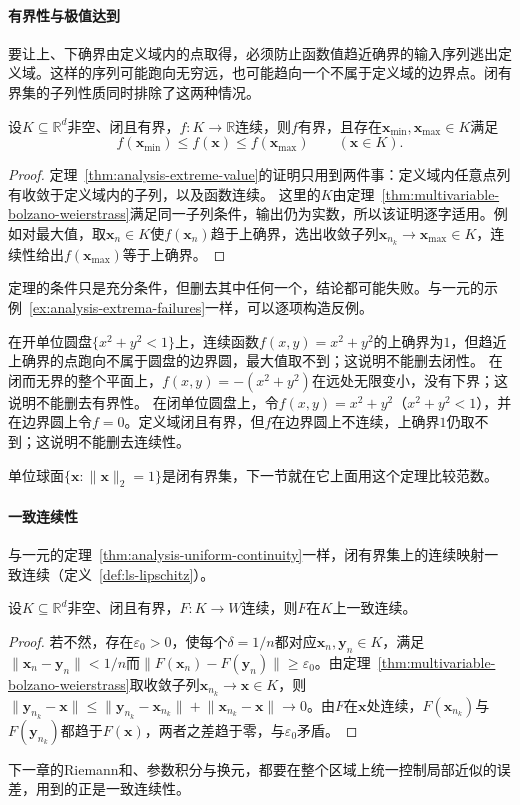\paragraph{有界性与极值达到}
要让上、下确界由定义域内的点取得，必须防止函数值趋近确界的输入序列逃出定义域。这样的序列可能跑向无穷远，也可能趋向一个不属于定义域的边界点。闭有界集的子列性质同时排除了这两种情况。
\begin{theorem}[闭有界集上的极值定理]
\label{thm:multivariable-extreme-value}
设$K\subseteq\mathbb R^d$非空、闭且有界，$f:K\to\mathbb R$连续，则$f$有界，且存在$\bm x_{\min},\bm x_{\max}\in K$满足
\[
 f(\bm x_{\min})\leq f(\bm x)\leq f(\bm x_{\max})\qquad(\bm x\in K).
\]
\end{theorem}
\begin{proof}
定理~\ref{thm:analysis-extreme-value}的证明只用到两件事：定义域内任意点列有收敛于定义域内的子列，以及函数连续。
这里的$K$由定理~\ref{thm:multivariable-bolzano-weierstrass}满足同一子列条件，输出仍为实数，所以该证明逐字适用。例如对最大值，取$\bm x_n\in K$使$f(\bm x_n)$趋于上确界，选出收敛子列$\bm x_{n_k}\to\bm x_{\max}\in K$，连续性给出$f(\bm x_{\max})$等于上确界。
\end{proof}
定理的条件只是充分条件，但删去其中任何一个，结论都可能失败。与一元的示例~\ref{ex:analysis-extrema-failures}一样，可以逐项构造反例。
\begin{example}
\label{ex:multivariable-extreme-value-failures}
在开单位圆盘$\{x^2+y^2<1\}$上，连续函数$f(x,y)=x^2+y^2$的上确界为$1$，但趋近上确界的点跑向不属于圆盘的边界圆，最大值取不到；这说明不能删去闭性。
在闭而无界的整个平面上，$f(x,y)=-(x^2+y^2)$在远处无限变小，没有下界；这说明不能删去有界性。
在闭单位圆盘上，令$f(x,y)=x^2+y^2$（$x^2+y^2<1$），并在边界圆上令$f=0$。定义域闭且有界，但$f$在边界圆上不连续，上确界$1$仍取不到；这说明不能删去连续性。
\end{example}

单位球面$\{\bm x:\lVert\bm x\rVert_2=1\}$是闭有界集，下一节就在它上面用这个定理比较范数。

\paragraph{一致连续性}
与一元的定理~\ref{thm:analysis-uniform-continuity}一样，闭有界集上的连续映射一致连续（定义~\ref{def:ls-lipschitz}）。
\begin{theorem}[闭有界集上的一致连续性]
\label{thm:multivariable-uniform-continuity}
设$K\subseteq\mathbb R^d$非空、闭且有界，$F:K\to W$连续，则$F$在$K$上一致连续。
\end{theorem}
\begin{proof}
若不然，存在$\varepsilon_0>0$，使每个$\delta=1/n$都对应$\bm x_n,\bm y_n\in K$，满足$\lVert\bm x_n-\bm y_n\rVert<1/n$而$\lVert F(\bm x_n)-F(\bm y_n)\rVert\geq\varepsilon_0$。由定理~\ref{thm:multivariable-bolzano-weierstrass}取收敛子列$\bm x_{n_k}\to\bm x\in K$，则$\lVert\bm y_{n_k}-\bm x\rVert\leq\lVert\bm y_{n_k}-\bm x_{n_k}\rVert+\lVert\bm x_{n_k}-\bm x\rVert\to0$。由$F$在$\bm x$处连续，$F(\bm x_{n_k})$与$F(\bm y_{n_k})$都趋于$F(\bm x)$，两者之差趋于零，与$\varepsilon_0$矛盾。
\end{proof}
下一章的Riemann和、参数积分与换元，都要在整个区域上统一控制局部近似的误差，用到的正是一致连续性。

